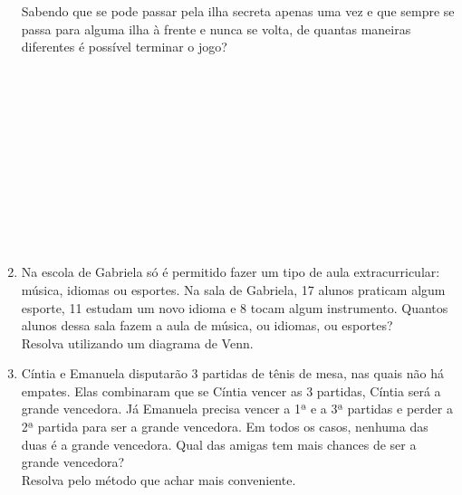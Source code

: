 \documentclass[a4paper,14pt]{article}
\begin{document}
\begin{multicols}{2}
\begin{enumerate}
			Sabendo que se pode passar pela ilha secreta apenas uma vez e que sempre se passa para alguma ilha à frente e nunca se volta, de quantas maneiras diferentes é possível terminar o jogo? \\\\\\\\\\\\\\\\\\\\\\\\
			\item Na escola de Gabriela só é permitido fazer um tipo de aula extracurricular: música, idiomas ou esportes. Na sala de Gabriela, 17 alunos praticam algum esporte, 11 estudam um novo idioma e 8 tocam algum instrumento. Quantos alunos dessa sala fazem a aula de música, ou idiomas, ou esportes? \\
			Resolva utilizando um diagrama de Venn. \newpage
			\item Cíntia e Emanuela disputarão 3 partidas de tênis de mesa, nas quais não há empates. Elas combinaram que se Cíntia vencer as 3 partidas, Cíntia será a grande vencedora. Já Emanuela precisa vencer a 1ª e a 3ª partidas e perder a 2ª partida para ser a grande vencedora. Em todos os casos, nenhuma das duas é a grande vencedora. Qual das amigas tem mais chances de ser a grande vencedora? \\
			Resolva pelo método que achar mais conveniente. \\\\\\\\\\\\\\\\\\\\\\\\\\\\\\\\\\\\\\\\\\\\\\\\\\\\\\

\end{enumerate}
\end{multicols}
\end{document}
